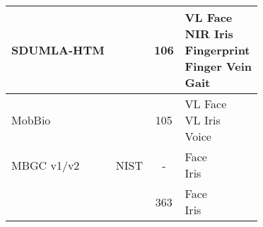 \begin{table}[H]
\begin{tabularx}{1.2\textwidth}{ XccX }
\hline
\rowcolor{lightGrey}
SDUMLA-HTM&\cite{Yin2011}&106&\makecell{VL Face  \\ NIR Iris \\ Fingerprint \\ Finger Vein\\Gait\\} \\
\hline
MobBio&\cite{Sequeira2014}&105& \makecell{VL Face \\ VL Iris \\ Voice} \\
\hline
\rowcolor{lightGrey}
MBGC v1/v2&NIST&-&\makecell{Face\\Iris}\\
\hline
&\cite{Bowyer2016b}&363&\makecell{Face\\Iris}\\
\hline
\end{tabularx}
\label{MultiDatabase}
\end{table}















